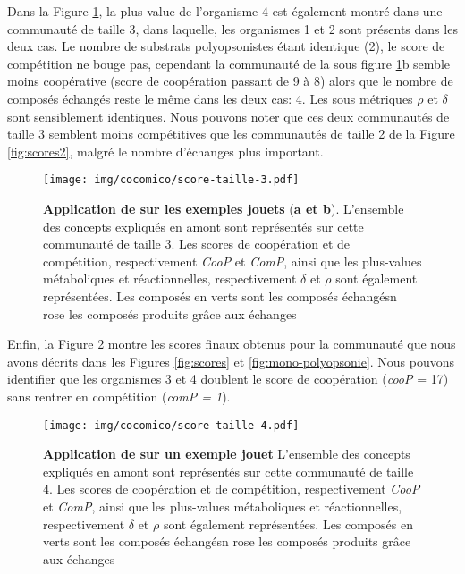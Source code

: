 \documentclass[../main.tex]{subfiles}
\begin{document}
Dans la Figure \ref{fig:scores3}, la plus-value de l'organisme 4 est également montré dans une communauté de taille 3, dans laquelle, les organismes 1 et 2 sont présents dans les deux cas. Le nombre de substrats polyopsonistes étant identique (2), le score de compétition ne bouge pas, cependant la communauté de la sous figure \ref{fig:scores3}b semble moins coopérative (score de coopération passant de 9 à 8) alors que le nombre de composés échangés reste le même dans les deux cas: 4. Les sous métriques $\rho$ et $\delta$ sont sensiblement identiques. Nous pouvons noter que ces deux communautés de taille 3 semblent moins compétitives que les communautés de taille 2 de la Figure \ref{fig:scores2}, malgré le nombre d'échanges plus important. 

\begin{figure}[H]
    \centering
    \texttt{[image: img/cocomico/score-taille-3.pdf]}
    \caption{\textbf{Application de \ccmc sur les exemples jouets} (\textbf{a et b}). L'ensemble des concepts expliqués en amont sont représentés sur cette communauté de taille 3. Les scores de coopération et de compétition, respectivement \textit{CooP} et \textit{ComP}, ainsi que les plus-values métaboliques et réactionnelles, respectivement $\delta$ et $\rho$ sont également représentées.  Les composés en verts sont les composés échangésn rose les composés produits grâce aux échanges}
    \label{fig:scores3}
\end{figure}


Enfin, la Figure \ref{fig:scores4} montre les scores finaux obtenus pour la communauté que nous avons décrits dans les Figures \ref{fig:scores} et \ref{fig:mono-polyopsonie}. Nous pouvons identifier que les organismes 3 et 4 doublent le score de coopération (\textit{cooP} = 17) sans rentrer en compétition (\textit{comP = 1}). 

\begin{figure}[H]
    \centering
    \texttt{[image: img/cocomico/score-taille-4.pdf]}
    \caption{\textbf{Application de \ccmc sur un exemple jouet} L'ensemble des concepts expliqués en amont sont représentés sur cette communauté de taille 4. Les scores de coopération et de compétition, respectivement \textit{CooP} et \textit{ComP}, ainsi que les plus-values métaboliques et réactionnelles, respectivement $\delta$ et $\rho$ sont également représentées.  Les composés en verts sont les composés échangésn rose les composés produits grâce aux échanges}
    \label{fig:scores4}
\end{figure}
\end{document}

